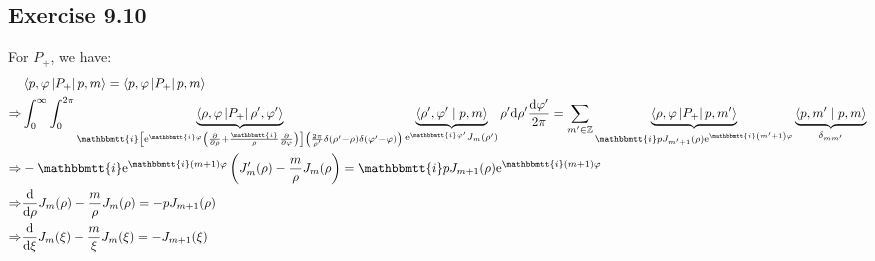 \documentclass[]{ctexart}
\newcommand{\mi}{\mathbbmtt{i}}
\newcommand{\di}{\mathrm{d}}
\newcommand{\me}{\mathrm{e}}
\begin{document}
\subsection{Exercise 9.10}
	For $P_+$, we have:
		\begin{equation*}
		\begin{aligned}
			&\left\langle p, \varphi\left|P_{+}\right| p, m\right\rangle=\left\langle p, \varphi\left|P_{+}\right| p, m\right\rangle\\
			\Rightarrow &\int_{0}^{\infty} \int_{0}^{2 \pi}\underbrace{\left\langle \rho, \varphi\left|P_{+}\right| \rho^{\prime}, \varphi^{\prime}\right\rangle}_{\mi\left[\me^{\mi \varphi}\left(\frac{\partial}{\partial \rho}+\frac{\mi}{\rho} \frac{\partial}{\partial \varphi}\right)\right]\left(\frac{2 \pi}{\rho^{\prime}} \delta\left(\rho^{\prime}-\rho\right) \delta\left(\varphi^{\prime}-\varphi\right)\right)}\underbrace{\left\langle\rho^{\prime}, \varphi^{\prime} \mid p, m\right\rangle}_{\me^{\mi \varphi'}J_m(\rho')} \rho^{\prime} \di \rho^{\prime} \frac{\di \varphi^{\prime}}{2 \pi}=\sum_{m^{\prime} \in \mathbb{Z}}\underbrace{\left\langle \rho, \varphi\left|P_{+}\right| p, m^{\prime}\right\rangle}_{\mi p J_{m^{\prime}+1}(\rho) \me^{\mi\left(m^{\prime}+1\right) \varphi}}\underbrace{\left\langle p, m^{\prime} \mid p,m\right\rangle}_{\delta_{mm'}}\\
			\Rightarrow &-\mi \me^{\mi(m+1) \varphi}\left(J_{m}^{\prime}(\rho)-\frac{m}{\rho} J_{m}(\rho\right)=\mi p J_{m+1}(\rho) \me^{\mi(m+1) \varphi}\\
			\Rightarrow &\frac{\di}{\di \rho} J_{m}(\rho)-\frac{m}{\rho} J_{m}(\rho)=-p J_{m+1}(\rho) \\
			\Rightarrow &\frac{\di}{\di \xi} J_{m}(\xi)-\frac{m}{\xi} J_{m}(\xi)=-J_{m+1}(\xi)
		\end{aligned}
		\end{equation*}
	
\end{document}

